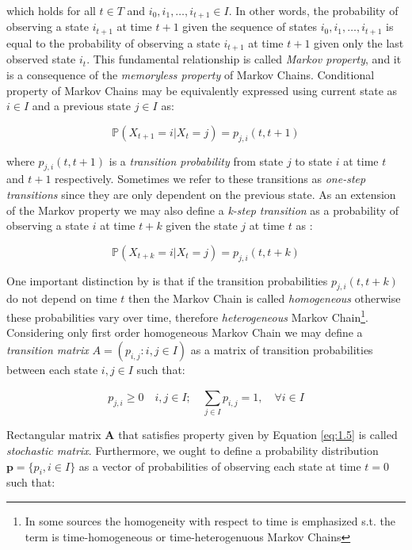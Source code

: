 which holds for all $t \in T$ and $i_0,i_1,\ldots,i_{t+1} \in I$. \citep{Praskova2012} In other words, the probability of observing a state $i_{t+1}$ at time $t+1$ given the sequence of states $i_0,i_1,\ldots,i_{t+1}$ is equal to the probability of observing a state $i_{t+1}$ at time $t+1$ given only the last observed state $i_t$.
This fundamental relationship is called {\it Markov property}, and it is a consequence of the \textit{memoryless property} of Markov Chains. \citep{Haggstrom2002}
Conditional property of Markov Chains may be equivalently expressed using current state as $i \in I$ and a previous state $j \in I$ as:

\begin{equation}
    \mathbb{P}(X_{t+1}=i|X_t=j) = p_{j,i}(t,t+1)
\end{equation}

where $p_{j,i}(t,t+1)$ is a {\it transition probability} from state $j$ to state $i$ at time $t$ and $t+1$ respectively. Sometimes we refer to these transitions as {\it one-step transitions} since they are only dependent on the previous state.
As an extension of the Markov property we may also define a \textit{k-step transition} as a probability of observing a state $i$ at time $t+k$ given the state $j$ at time $t$ as \citep{Tolver2016}:

\begin{equation}
    \mathbb{P}(X_{t+k}=i|X_t=j) = p_{j,i}(t,t+k)
\end{equation}

One important distinction by \citep{Weinan2019} is that if the transition probabilities $p_{j,i}(t,t+k)$ do not depend on time $t$ then the Markov Chain is called \textit{homogeneous} otherwise these probabilities vary over time, therefore \textit{heterogeneous} Markov Chain\footnote{In some sources the homogeneity with respect to time is emphasized s.t. the term is time-homogeneous or time-heterogenuous Markov Chains}.
Considering only first order homogeneous Markov Chain we may define a \textit{transition matrix} 
$A = (p_{i,j} : i,j \in I)$ as a matrix of transition probabilities between each state $i,j \in I$ such that:

\begin{equation} \label{eq:1.5}
p_{j,i} \geq 0 \quad i,j \in I; \quad \sum\limits_{j \in I} ^{}p_{i,j} = 1, \quad \forall i \in I
\end{equation}

Rectangular matrix $\textbf{A}$ that satisfies property given by Equation \ref{eq:1.5} is called \textit{stochastic matrix}. \citep{Gagniuc2017}
Furthermore, we ought to define a probability distribution $\textbf{p} =\{p_i, i \in I\} $ as a vector of probabilities of observing each state at time $t=0$ such that:

